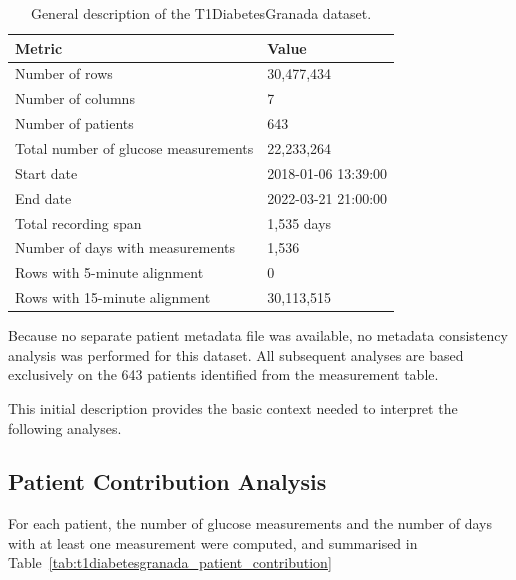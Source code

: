 \begin{table}[htbp]
    \centering
    \caption{General description of the T1DiabetesGranada dataset.}
    \label{tab:t1diabetesgranada_general_description}
    \begin{tabular}{ll}
        \hline
        \textbf{Metric} & \textbf{Value} \\
        \hline
        Number of rows & 30,477,434 \\
        Number of columns & 7 \\
        Number of patients & 643 \\
        Total number of glucose measurements & 22,233,264 \\
        \hline
        Start date & 2018-01-06 13:39:00 \\
        End date & 2022-03-21 21:00:00 \\
        Total recording span & 1,535 days \\
        Number of days with measurements & 1,536 \\
        \hline
        Rows with 5-minute alignment & 0 \\
        Rows with 15-minute alignment & 30,113,515 \\
        \hline
    \end{tabular}
\end{table}

Because no separate patient metadata file was available, no metadata consistency analysis was performed for this dataset. All subsequent analyses are based exclusively on the 643 patients identified from the measurement table.

This initial description provides the basic context needed to interpret the following analyses.

\subsection{Patient Contribution Analysis}
\label{subsec:t1diabetesgranada_patient_contribution}

For each patient, the number of glucose measurements and the number of days with at least one measurement were computed, and summarised in Table~\ref{tab:t1diabetesgranada_patient_contribution}

